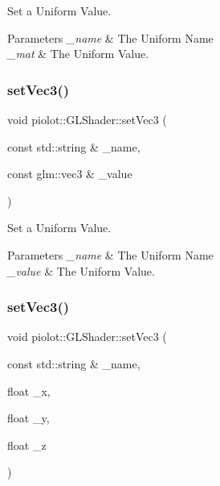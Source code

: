 Set a Uniform Value. 


\begin{DoxyParams}{Parameters}
{\em \+\_\+name} & The Uniform Name \\
\hline
{\em \+\_\+mat} & The Uniform Value. \\
\hline
\end{DoxyParams}
\mbox{\label{classpiolot_1_1_g_l_shader_a47d614244dc667768a36b9cea1675eca}} 
\subsubsection{\texorpdfstring{set\+Vec3()}{setVec3()}\hspace{0.1cm}{\footnotesize\ttfamily [1/2]}}
{\footnotesize\ttfamily void piolot\+::\+G\+L\+Shader\+::set\+Vec3 (\begin{DoxyParamCaption}\item[{const std\+::string \&}]{\+\_\+name,  }\item[{const glm\+::vec3 \&}]{\+\_\+value }\end{DoxyParamCaption})\hspace{0.3cm}{\ttfamily [inline]}}



Set a Uniform Value. 


\begin{DoxyParams}{Parameters}
{\em \+\_\+name} & The Uniform Name \\
\hline
{\em \+\_\+value} & The Uniform Value. \\
\hline
\end{DoxyParams}
\mbox{\label{classpiolot_1_1_g_l_shader_a293369149f4ad507543cb0fcd783afd1}} 
\subsubsection{\texorpdfstring{set\+Vec3()}{setVec3()}\hspace{0.1cm}{\footnotesize\ttfamily [2/2]}}
{\footnotesize\ttfamily void piolot\+::\+G\+L\+Shader\+::set\+Vec3 (\begin{DoxyParamCaption}\item[{const std\+::string \&}]{\+\_\+name,  }\item[{float}]{\+\_\+x,  }\item[{float}]{\+\_\+y,  }\item[{float}]{\+\_\+z }\end{DoxyParamCaption})\hspace{0.3cm}{\ttfamily [inline]}}



